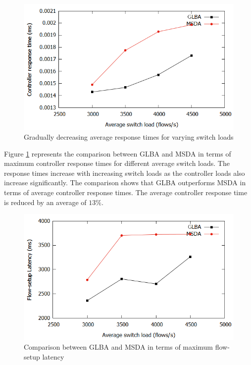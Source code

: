 \documentclass[a4paper,fleqn]{cas-dc}
\begin{document}
\begin{figure}
	\centering
	\includegraphics[width=\linewidth]{Images/response_comparison_edit.png}
	\caption{Gradually decreasing average response times for varying switch loads} \label{fig:Rcomparison}
\end{figure}

Figure \ref{fig:Rcomparison} represents the comparison between GLBA and MSDA in terms of maximum controller response times for different average switch loads. The response times increase with increasing switch loads as the controller loads also increase significantly. The comparison shows that GLBA outperforms MSDA in terms of average controller response times. The average controller response time is reduced by an average of $13\%$.

\begin{figure}
	\centering
	\includegraphics[width=\linewidth]{Images/omega_comparison_edit.png}
	\caption{Comparison between GLBA and MSDA in terms of maximum flow-setup latency} \label{fig:Ocomparison}
\end{figure}
\end{document}
